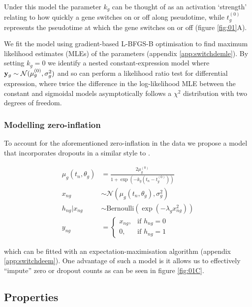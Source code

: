 Under this model the parameter $k_g$ can be thought of as an activation `strength' relating to how quickly a gene switches on or off along pseudotime, while $t^{(0)}_g$ represents the pseudotime at which the gene switches on or off (figure \ref{fig:01}A).

We fit the model using gradient-based L-BFGS-B optimisation to find maximum likelihood estimates (MLEs) of the parameters (appendix \ref{app:switchdemle}). By setting $k_g = 0$ we identify a nested constant-expression model where ${\bf y}_g \sim \mathcal{N}({\mu^{(0)}_g}, \sigma^2_g)$ and so can perform a likelihood ratio test for differential expression, where twice the difference in the log-likelihood MLE between the constant and sigmoidal models asymptotically follows a $\chi^2$ distribution with two degrees of freedom.

\subsubsection{Modelling zero-inflation}

To account for the aforementioned zero-inflation in the data we propose a model that incorporates dropouts in a similar style to \cite{pierson2015zifa}.

\begin{equation}
\begin{aligned}
\mu_g(t_n, \theta_g) & = \frac{2 \mu^{(0)}_g}{1 + \exp\left(-k_g(t_n - t^{(0)}_g)\right)} \\
x_{ng} & \sim \mathcal{N}(\mu_g(t_n, \theta_g), \sigma_g^2) \\
h_{ng} | x_{ng} & \sim \mathrm{Bernoulli}(\exp(-\lambda_g x_{ng}^2)) \\
    y_{ng} &=
\begin{cases}
    x_{ng} ,& \text{if } h_{ng} = 0\\
    0,  & \text{if } h_{ng} = 1
\end{cases}
\end{aligned}
\end{equation}

which can be fitted with an expectation-maximisation algorithm (appendix \ref{app:switchdeem}). One advantage of such a model is it allows us to effectively ``impute'' zero or dropout counts as can be seen in figure \ref{fig:01C}.


\subsection{Properties}


